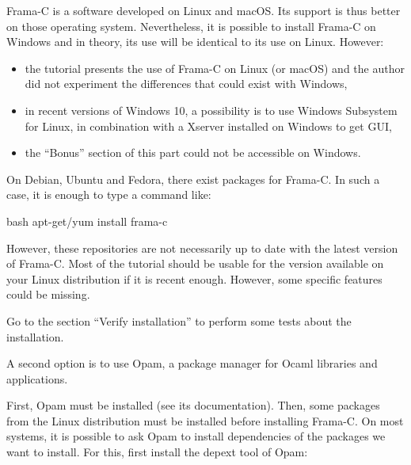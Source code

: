 Frama-C is a software developed on Linux and macOS. Its support is thus better
on those operating system. Nevertheless, it is possible to install Frama-C
on Windows and in theory, its use will be identical to its use on Linux.
However:
\begin{Warning}
\begin{itemize}
  \item the tutorial presents the use of Frama-C on Linux (or macOS) and
    the author did not experiment the differences that could exist with Windows,
  \item in recent versions of Windows 10, a possibility is to use Windows
    Subsystem for Linux, in combination with a Xserver installed on Windows
    to get GUI,
  \item the ``Bonus'' section of this part could not be accessible on Windows.
  \end{itemize}
\end{Warning}






On Debian, Ubuntu and Fedora, there exist packages for Frama-C. In
such a case, it is enough to type a command like:



\begin{CodeBlock}{bash}
apt-get/yum install frama-c
\end{CodeBlock}



However, these repositories are not necessarily up to date with the latest
version of Frama-C. Most of the tutorial should be usable for the version
available on your Linux distribution if it is recent enough. However, some
specific features could be missing.



Go to the section ``Verify installation'' to perform some tests about
the installation.






A second option is to use Opam, a package manager for Ocaml libraries
and applications.



First, Opam must be installed (see its documentation). Then, some
packages from the Linux distribution must be installed before
installing Frama-C. On most systems, it is possible to ask Opam to install
dependencies of the packages we want to install. For this, first install
the depext tool of Opam:


